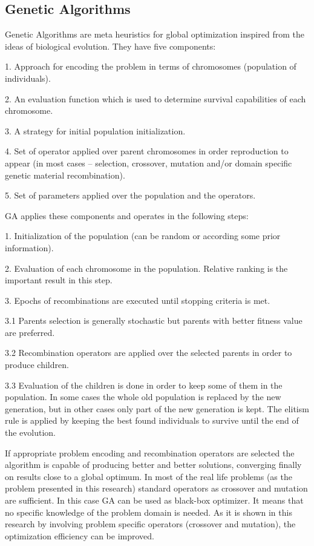 \documentclass{llncs}
\begin{document}
\subsection{Genetic Algorithms}
%
Genetic Algorithms are meta heuristics for global optimization inspired from the ideas of biological evolution. They have five components:

1. Approach for encoding the problem in terms of chromosomes (population of individuals).

2. An evaluation function which is used to determine survival capabilities of each chromosome.

3. A strategy for initial population initialization.

4. Set of operator applied over parent chromosomes in order reproduction to appear (in most cases – selection, crossover, mutation and/or domain specific genetic material recombination).

5. Set of parameters applied over the population and the operators.

\vspace{4 mm}

GA applies these components and operates in the following steps:

1. Initialization of the population (can be random or according some prior information).

2. Evaluation of each chromosome in the population. Relative ranking is the important result in this step.

3. Epochs of recombinations are executed until stopping criteria is met.

  \hspace{4 mm}3.1 Parents selection is generally stochastic but parents with better fitness value are preferred.
  
  \hspace{4 mm}3.2 Recombination operators are applied over the selected parents in order to produce children.
  
  \hspace{4 mm}3.3 Evaluation of the children is done in order to keep some of them in the population. In some cases the whole old population is replaced by the new generation, but in other cases only part of the new generation is kept. The elitism rule is applied by keeping the best found individuals to survive until the end of the evolution.

If appropriate problem encoding and recombination operators are selected the algorithm is capable of producing better and better solutions, converging finally on results close to a global optimum. In most of the real life problems (as the problem presented in this research) standard operators as crossover and mutation are sufficient. In this case GA can be used as black-box optimizer. It means that no specific knowledge of the problem domain is needed. As it is shown in this research by involving problem specific operators (crossover and mutation), the optimization efficiency can be improved. 
\end{document}
